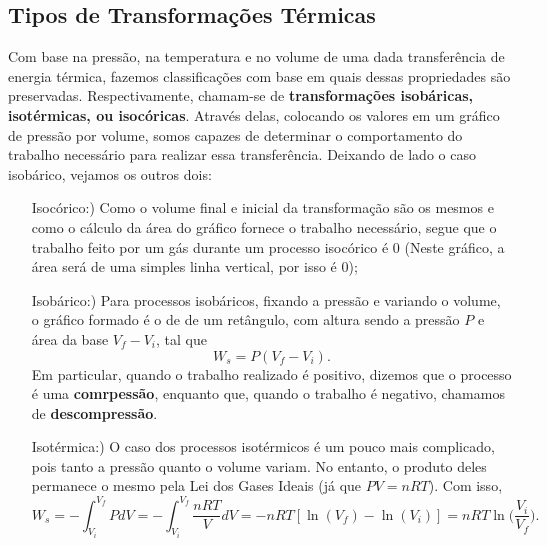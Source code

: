 \documentclass{article}
\begin{document}
\subsection{Tipos de Transformações Térmicas}
Com base na pressão, na temperatura e no volume de uma dada transferência de energia térmica, fazemos
classificações com base em quais dessas propriedades são preservadas. Respectivamente, chamam-se
de \textbf{transformações isobáricas, isotérmicas, ou isocóricas}. Através delas, colocando os valores em um gráfico
de pressão por volume, somos capazes de determinar o comportamento do trabalho necessário para realizar essa transferência.
Deixando de lado o caso isobárico, vejamos os outros dois:
\begin{itemize}
  \item [Isocórico:)] Como o volume final e inicial da transformação são os mesmos
    e como o cálculo da área do gráfico fornece o trabalho necessário, segue que o trabalho feito por um gás durante
    um processo isocórico é 0 (Neste gráfico, a área será de uma simples linha vertical, por isso é 0);
  \item [Isobárico:)] Para processos isobáricos, fixando a pressão e variando o volume, o gráfico formado é o de
    de um retângulo, com altura sendo a pressão \(P\) e área da base \(V_{f} - V_{i}\), tal que 
    \[
      W_{s} = P(V_{f} - V_{i}).
    \]
    Em particular, quando o trabalho realizado é positivo, dizemos que o processo é uma \textbf{comrpessão}, enquanto que,
    quando o trabalho é negativo, chamamos de \textbf{descompressão}.
  \item [Isotérmica:)] O caso dos processos isotérmicos é um pouco mais complicado, pois tanto a pressão quanto o volume variam.
    No entanto, o produto deles permanece o mesmo pela Lei dos Gases Ideais (já que \(PV = nRT\)). Com isso, 
    \[
      W_{s} = -\int_{V_{i}}^{V_{f}}PdV = - \int_{V_{i}}^{V_{f}} \frac{nRT}{V}dV = -nRT[\ln{(V_{f})}-\ln{(V_{i})}] = nRT\ln{\biggl(\frac{V_{i}}{V_{f}}\biggr)}.
    \]
\end{itemize}
\end{document}
